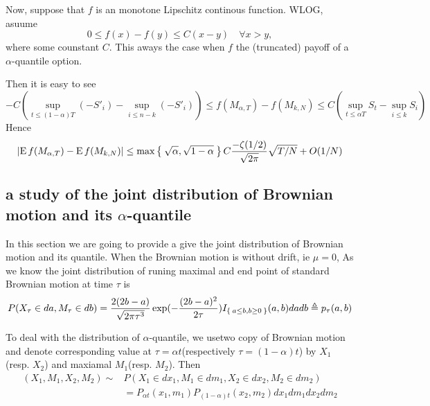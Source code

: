 \documentclass[11pt]{book}
\def\abs#1{{\left|#1\right|}}
\def\E{{\mathrm{E}\,}}
\begin{document}
Now, suppose that $f$ is an monotone Lipschitz continous function.
WLOG, asuume
\begin{equation}\label{eq:lips}
0 \leq f(x)-f(y) \leq C (x-y) \quad \forall x>y,
\end{equation}
where some counstant $C$. This aways the case when $f$ the
(truncated) payoff of a $\alpha$-quantile option.

Then it is easy to see
\[
-C\left( \sup_{t\leq (1-\alpha)T} (-S'_i)-\sup_{i\leq n-k} (-S'_i)\right)
 \leq f(M_{\alpha,T}) - f(M_{k,N})
\leq  C \left(\sup_{t\leq \alpha{T}} S_t - \sup_{i\leq k} S_i\right)
\]
Hence
\[
\abs{\E f(M_{\alpha,T}) - \E f(M_{k,N})}
\leq \max\Set{\sqrt{\alpha}, \sqrt{1-\alpha}}
C\frac{-\zeta(1/2)}{\sqrt{2\pi}}\sqrt{T/N}  + O(1/N)
\]


\subsection{a study of the joint distribution of Brownian motion and its $\alpha$-quantile}
In this section we are going to provide a give the joint distribution of Brownian motion and its quantile. When the Brownian motion is without drift,
ie $\mu = 0 $,
As we know the joint distribution of runing maximal and end point of
standard Brownian motion at time $\tau$ is
\[
P(X_\tau\in da, M_\tau\in db) =
\frac{2(2b-a)}{\sqrt{2\pi \tau^3}} \exp(-\frac{(2b-a)^2}{2\tau})
I_{\Set{a\leq b, b\geq 0}} (a,b) da db \triangleq p_\tau(a,b)
\]

To deal with the distribution of $\alpha$-quantile, we usetwo copy of
Brownian motion and denote corresponding value at
$\tau=\alpha t$(respectively $\tau=(1-\alpha) t$) by $X_1$(resp. $X_2$) and
maxiamal $M_1$(resp. $M_2$).
Then
\[
\begin{split}
(X_1,M_1, X_2, M_2) \sim& P(X_1\in dx_1, M_1\in dm_1, X_2\in dx_2, M_2\in dm_2)\\
&= P_{\alpha t}(x_1, m_1) P_{(1-\alpha)t}(x_2,m_2) dx_1dm_1dx_2dm_2
\end{split}
\]
\end{document}
